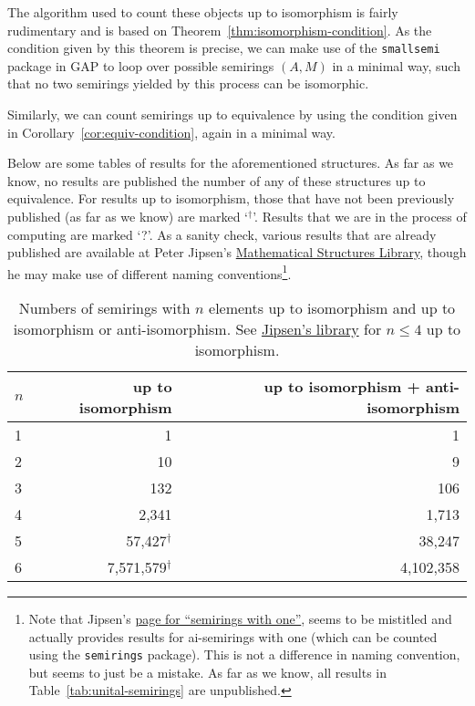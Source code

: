 \documentclass{article}
\theoremstyle{definition}
\theoremstyle{plain}
\begin{document}
The algorithm used to count these objects up to isomorphism is fairly
rudimentary and is based on Theorem~\ref{thm:isomorphism-condition}.
As the condition given by this theorem is precise, we can make use of
the \texttt{smallsemi} package in GAP to loop over possible semirings
\((A, M)\) in a minimal way, such that no two semirings yielded by
this process can be isomorphic.

Similarly, we can count semirings up to equivalence by using the
condition given in Corollary~\ref{cor:equiv-condition}, again in a minimal way.

Below are some tables of results for the aforementioned structures.
As far as we know, no results are published the number of any of
these structures up to equivalence. For results up to isomorphism,
those that have not been previously published (as far as we know) are
marked `$^\dagger$'. Results that we are in the process of computing
are marked `?'. As a sanity check, various results that are already
published are available at Peter Jipsen's
\href{https://math.chapman.edu/~jipsen/structures/doku.php?id=start}{Mathematical
Structures Library}, though he may make use of different naming
conventions\footnote{Note that Jipsen's
  \href{https://math.chapman.edu/~jipsen/structures/doku.php?id=semirings_with_identity\#finite_members}{page
  for ``semirings with one''}, seems to be mistitled and actually
  provides results for ai-semirings with one (which can be counted
  using the \texttt{semirings} package). This is not a difference in
  naming convention, but seems to just be a mistake. As far as we know,
all results in Table~\ref{tab:unital-semirings} are unpublished.}.
\begin{table}[ht]
  \centering
  \begin{tabular}{l|r|r}
    \toprule
    $n$ & up to isomorphism & up to isomorphism + anti-isomorphism \\
    \midrule
    1 & 1         & 1         \\
    2 & 10        & 9         \\
    3 & 132       & 106       \\
    4 & 2,341     & 1,713     \\
    5 & 57,427$^\dagger$    & 38,247    \\
    6 & 7,571,579$^\dagger$  & 4,102,358 \\
  \end{tabular}
  \caption{Numbers of semirings with $n$ elements up to isomorphism and up
    to isomorphism or anti-isomorphism. See
    \href{https://math.chapman.edu/~jipsen/structures/doku.php?id=semirings\#finite_members}{Jipsen's
  library} for \(n\leq4\) up to isomorphism.}
  \label{tab:semirings}
\end{table}
\end{document}
